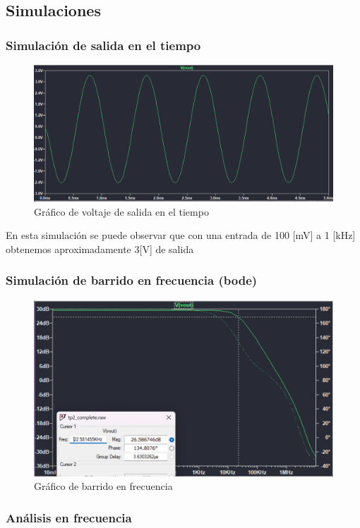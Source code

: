 \newpage
\subsection{Simulaciones}

\subsubsection{Simulación de salida en el tiempo}
 
\begin{figure}[h!]
    \centering
    \includegraphics[width=0.80\linewidth]{img/tiempo.png}
    \caption{Gráfico de voltaje de salida en el tiempo}
    \label{fig:tiempo}
\end{figure}

En esta simulación se puede observar que con una entrada de 100 [mV] a 1 [kHz] obtenemos aproximadamente 3[V] de salida


\subsubsection{Simulación de barrido en frecuencia (bode)}
\begin{figure}[h!]
    \centering
    \includegraphics[width=0.80\linewidth]{img/bode1a.png}
    \caption{Gráfico de barrido en frecuencia}
    \label{fig:bode1a}
\end{figure}


\subsubsection{Análisis en frecuencia }


